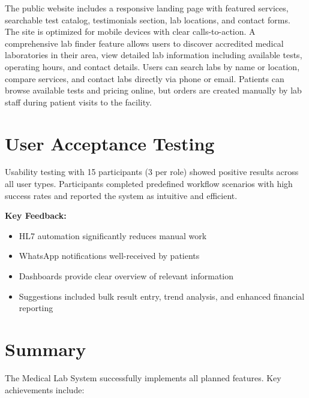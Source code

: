 \documentclass[12pt, a4paper]{report}
\begin{document}
The public website includes a responsive landing page with featured services, searchable test catalog, testimonials section, lab locations, and contact forms. The site is optimized for mobile devices with clear calls-to-action. A comprehensive lab finder feature allows users to discover accredited medical laboratories in their area, view detailed lab information including available tests, operating hours, and contact details. Users can search labs by name or location, compare services, and contact labs directly via phone or email. Patients can browse available tests and pricing online, but orders are created manually by lab staff during patient visits to the facility.

\section{User Acceptance Testing}

Usability testing with 15 participants (3 per role) showed positive results across all user types. Participants completed predefined workflow scenarios with high success rates and reported the system as intuitive and efficient.

\textbf{Key Feedback:}
\begin{itemize}
    \item HL7 automation significantly reduces manual work
    \item WhatsApp notifications well-received by patients
    \item Dashboards provide clear overview of relevant information
    \item Suggestions included bulk result entry, trend analysis, and enhanced financial reporting
\end{itemize}

\section{Summary}

The Medical Lab System successfully implements all planned features. Key achievements include:
\end{document}
